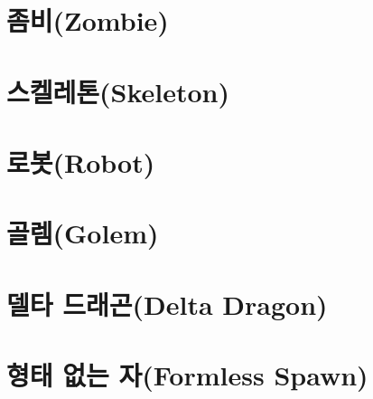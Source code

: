 \documentclass{report}
\begin{document}
	\hypertarget{species:zombie}{}
	\section{좀비(Zombie)}
		
	
	\hypertarget{species:skeleton}{}
	\section{스켈레톤(Skeleton)}
		
		
	\section{로봇(Robot)}
		
	
	\section{골렘(Golem)}
		
	
	\section{델타 드래곤(Delta Dragon)}
		
	
	\section{형태 없는 자(Formless Spawn)}
		
	
\end{document}
